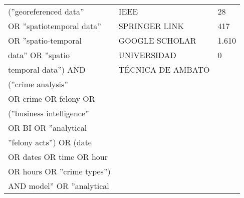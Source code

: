 \begin{longtable}{|l|l|l|}
    \hline \hline
    \endlastfoot
    (''georeferenced data''                      & IEEE                                                 & 28                                                 \\ \cline{2-3}
    OR ''spatiotemporal data''                   & SPRINGER LINK                                        & 417                                                \\ \cline{2-3}
    OR ''spatio-temporal                         & GOOGLE SCHOLAR                                       & 1.610                                              \\ \cline{2-3}
    data'' OR ''spatio                           & UNIVERSIDAD                                          & 0                                                  \\ \cline{2-3}
    temporal data'') AND                         & TÉCNICA DE AMBATO                                    &                                                    \\ \cline{2-3}
    (''crime analysis''                          &                                                      &                                                    \\ \cline{2-3}
    OR crime OR felony OR                        &                                                      &                                                    \\ \cline{2-3}
    (''business intelligence''                   &                                                      &                                                    \\ \cline{2-3}
    OR BI OR ''analytical                        &                                                      &                                                    \\ \cline{2-3}
    ''felony acts'') OR (date                    &                                                      &                                                    \\ \cline{2-3}
    OR dates OR time OR  hour                    &                                                      &                                                    \\ \cline{2-3}
    OR hours OR ''crime types'')                 &                                                      &                                                    \\ \cline{2-3}
    AND  model'' OR ''analytical                 &                                                      &                                                    \\ \cline{2-3}

\end{longtable}
